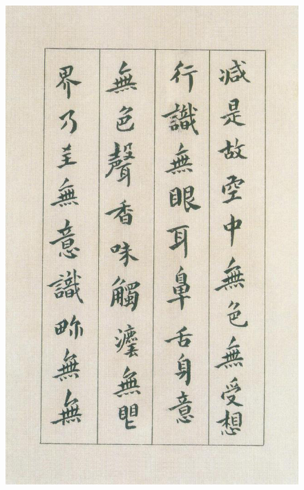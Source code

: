 \documentclass[a4paper,twoside]{article}
\begin{document}
\begin{figure}[ht]
\centering
\includegraphics[width=13.8cm]{images/fushan-3}
\end{figure}
\end{document}
